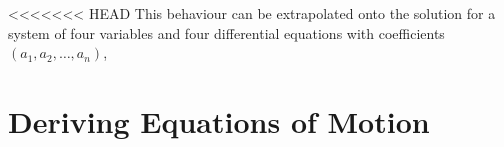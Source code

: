 \documentclass[12pt]{article}
\begin{document}
<<<<<<< HEAD
	This behaviour can be extrapolated onto the solution for a system of four variables and four differential equations with coefficients $(a_1, a_2, \dots, a_n)$,
	
	
	\newpage
	
	\section{Deriving Equations of Motion}
	
\end{document}
